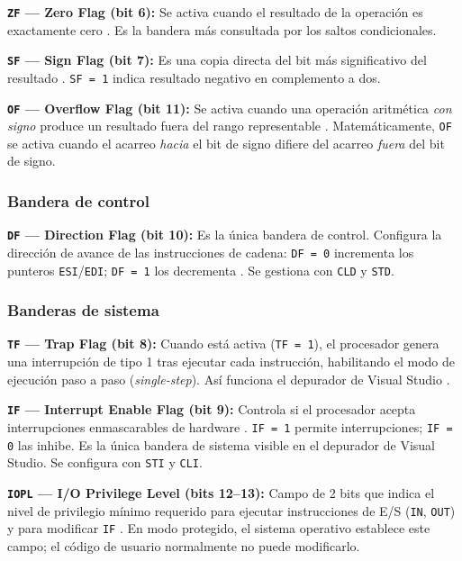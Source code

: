 \documentclass[a4paper,12pt]{article}
\begin{document}
\textbf{\texttt{ZF} — Zero Flag (bit 6):} Se activa cuando el resultado de la operación es exactamente cero \cite{irvine2020assembly}. Es la bandera más consultada por los saltos condicionales.

\textbf{\texttt{SF} — Sign Flag (bit 7):} Es una copia directa del bit más significativo del resultado \cite{elahi2022computer}. \texttt{SF = 1} indica resultado negativo en complemento a dos.

\textbf{\texttt{OF} — Overflow Flag (bit 11):} Se activa cuando una operación aritmética \emph{con signo} produce un resultado fuera del rango representable \cite{irvine2020assembly}. Matemáticamente, \texttt{OF} se activa cuando el acarreo \emph{hacia} el bit de signo difiere del acarreo \emph{fuera} del bit de signo.

\subsubsection*{Bandera de control}

\textbf{\texttt{DF} — Direction Flag (bit 10):} Es la única bandera de control. Configura la dirección de avance de las instrucciones de cadena: \texttt{DF = 0} incrementa los punteros \texttt{ESI}/\texttt{EDI}; \texttt{DF = 1} los decrementa \cite{irvine2011assembly}. Se gestiona con \texttt{CLD} y \texttt{STD}.

\subsubsection*{Banderas de sistema}

\textbf{\texttt{TF} — Trap Flag (bit 8):} Cuando está activa (\texttt{TF = 1}), el procesador genera una interrupción de tipo 1 tras ejecutar cada instrucción, habilitando el modo de ejecución paso a paso (\textit{single-step}). Así funciona el depurador de Visual Studio \cite{stallings2019computer}.

\textbf{\texttt{IF} — Interrupt Enable Flag (bit 9):} Controla si el procesador acepta interrupciones enmascarables de hardware \cite{tanenbaum2013structured}. \texttt{IF = 1} permite interrupciones; \texttt{IF = 0} las inhibe. Es la única bandera de sistema visible en el depurador de Visual Studio. Se configura con \texttt{STI} y \texttt{CLI}.

\textbf{\texttt{IOPL} — I/O Privilege Level (bits 12--13):} Campo de 2 bits que indica el nivel de privilegio mínimo requerido para ejecutar instrucciones de E/S (\texttt{IN}, \texttt{OUT}) y para modificar \texttt{IF} \cite{patterson2016computer}. En modo protegido, el sistema operativo establece este campo; el código de usuario normalmente no puede modificarlo.
\end{document}
